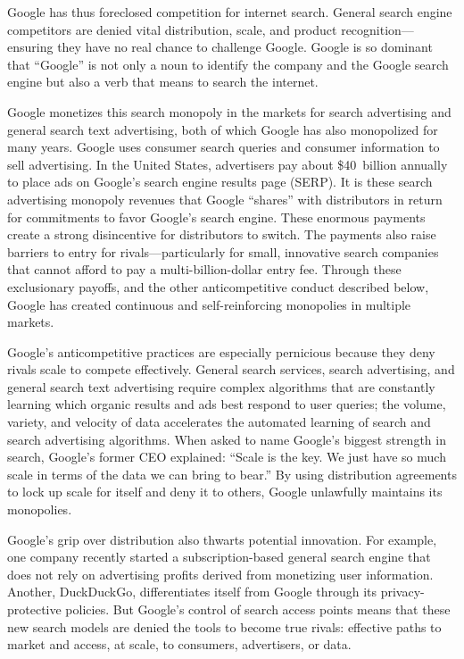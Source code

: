 \documentclass[11pt,b5paper,headings=small]{scrartcl}
\begin{document}

Google has thus foreclosed competition for internet search. General search engine
competitors are denied vital distribution, scale, and product recognition—ensuring they have no
real chance to challenge Google. Google is so dominant that “Google” is not only a noun to
identify the company and the Google search engine but also a verb that means to search the
internet.


Google monetizes this search monopoly in the markets for search advertising and
general search text advertising, both of which Google has also monopolized for many years.
Google uses consumer search queries and consumer information to sell advertising. In the United
States, advertisers pay about \$40~billion annually to place ads on Google’s search engine results
page (SERP). It is these search advertising monopoly revenues that Google “shares” with
distributors in return for commitments to favor Google’s search engine. These enormous
payments create a strong disincentive for distributors to switch. The payments also raise barriers
to entry for rivals—particularly for small, innovative search companies that cannot afford to pay
a multi-billion-dollar entry fee. Through these exclusionary payoffs, and the other
anticompetitive conduct described below, Google has created continuous and self-reinforcing
monopolies in multiple markets.


Google’s anticompetitive practices are especially pernicious because they deny
rivals scale to compete effectively. General search services, search advertising, and general
search text advertising require complex algorithms that are constantly learning which organic
results and ads best respond to user queries; the volume, variety, and velocity of data accelerates
the automated learning of search and search advertising algorithms. When asked to name
Google’s biggest strength in search, Google’s former CEO explained: “Scale is the key. We just
have so much scale in terms of the data we can bring to bear.” By using distribution agreements
to lock up scale for itself and deny it to others, Google unlawfully maintains its monopolies.


Google’s grip over distribution also thwarts potential innovation. For example,
one company recently started a subscription-based general search engine that does not rely on
advertising profits derived from monetizing user information. Another, DuckDuckGo,
differentiates itself from Google through its privacy-protective policies. But Google’s control of
search access points means that these new search models are denied the tools to become true
rivals: effective paths to market and access, at scale, to consumers, advertisers, or data.
\end{document}
